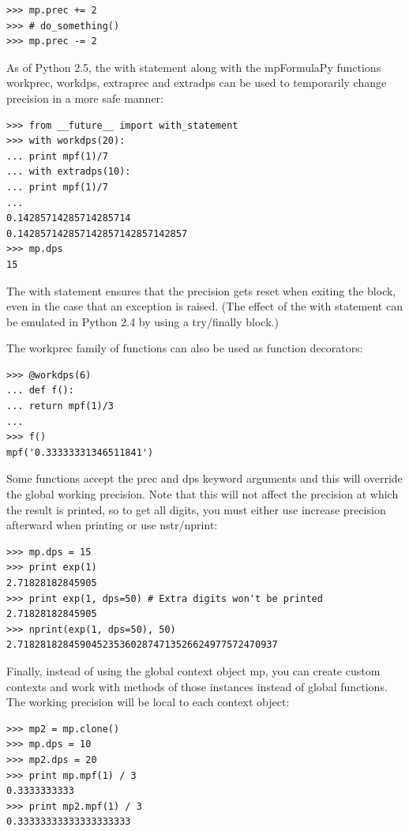 \begin{lstlisting}
>>> mp.prec += 2
>>> # do_something()
>>> mp.prec -= 2
\end{lstlisting}


As of Python 2.5, the with statement along with the mpFormulaPy functions workprec, workdps, extraprec and extradps can be used to temporarily change precision in a more safe manner:

\begin{lstlisting}
>>> from __future__ import with_statement
>>> with workdps(20):
... print mpf(1)/7
... with extradps(10):
... print mpf(1)/7
...
0.14285714285714285714
0.142857142857142857142857142857
>>> mp.dps
15
\end{lstlisting}


The with statement ensures that the precision gets reset when exiting the block, even in the case that an exception is raised. (The effect of the with statement can be emulated in Python 2.4 by using a try/finally block.)

The workprec family of functions can also be used as function decorators:

\begin{lstlisting}
>>> @workdps(6)
... def f():
... return mpf(1)/3
...
>>> f()
mpf('0.33333331346511841')
\end{lstlisting}


Some functions accept the prec and dps keyword arguments and this will override the global working precision. Note that this will not affect the precision at which the result is printed, so to get all digits, you must either use increase precision afterward when printing or use nstr/nprint:

\begin{lstlisting}
>>> mp.dps = 15
>>> print exp(1)
2.71828182845905
>>> print exp(1, dps=50) # Extra digits won't be printed
2.71828182845905
>>> nprint(exp(1, dps=50), 50)
2.7182818284590452353602874713526624977572470937
\end{lstlisting}


Finally, instead of using the global context object mp, you can create custom contexts and work with methods of those instances instead of global functions. The working precision will be local to each context object:

\begin{lstlisting}
>>> mp2 = mp.clone()
>>> mp.dps = 10
>>> mp2.dps = 20
>>> print mp.mpf(1) / 3
0.3333333333
>>> print mp2.mpf(1) / 3
0.33333333333333333333
\end{lstlisting}


